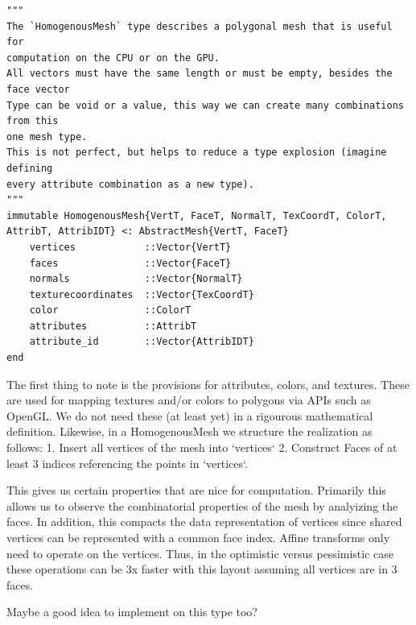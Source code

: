 \begin{lstlisting}
"""
The `HomogenousMesh` type describes a polygonal mesh that is useful for
computation on the CPU or on the GPU.
All vectors must have the same length or must be empty, besides the face vector
Type can be void or a value, this way we can create many combinations from this
one mesh type.
This is not perfect, but helps to reduce a type explosion (imagine defining
every attribute combination as a new type).
"""
immutable HomogenousMesh{VertT, FaceT, NormalT, TexCoordT, ColorT, AttribT, AttribIDT} <: AbstractMesh{VertT, FaceT}
    vertices            ::Vector{VertT}
    faces               ::Vector{FaceT}
    normals             ::Vector{NormalT}
    texturecoordinates  ::Vector{TexCoordT}
    color               ::ColorT
    attributes          ::AttribT
    attribute_id        ::Vector{AttribIDT}
end
\end{lstlisting}

The first thing to note is the provisions for attributes, colors, and textures.
These are used for mapping textures and/or colors to polygons via APIs such as
OpenGL. We do not need these (at least yet) in a rigourous mathematical
definition. Likewise, in a HomogenousMesh we structure the realization as
follows: 1. Insert all vertices of the mesh into `vertices` 2. Construct
Faces of at least 3 indices referencing the points in `vertices`.

This gives us certain properties that are nice for computation. Primarily
this allows us to observe the combinatorial properties of the mesh by analyizing
the faces. In addition, this compacts the data representation of vertices
since shared vertices can be represented with a common face index. Affine
transforms only need to operate on the vertices. Thus, in the optimistic versus
pessimistic case these operations can be 3x faster with this layout
assuming all vertices are in 3 faces.

Maybe a good idea to implement on this type too?

